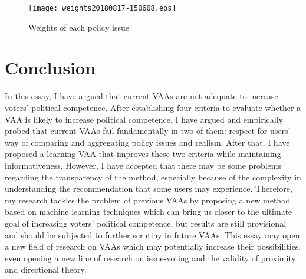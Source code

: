 \documentclass{scrartcl}
\begin{document}
\begin{figure}[h]
    \centering 
    \texttt{[image: weights20180817-150608.eps]}
    \label{fig:weights}
    \caption{Weights of each policy issue}
\end{figure}



\section{Conclusion}

In this essay, I have argued that current VAAs are not adequate to increase voters' political competence. After establishing four criteria to evaluate whether a VAA is likely to increase political competence, I have argued and empirically probed that current VAAs fail fundamentally in two of them: respect for users' way of comparing and aggregating policy issues and realism. After that, I have proposed a learning VAA that improves these two criteria while maintaining informativeness. However, I have accepted that there may be some problems regarding the transparency of the method, especially because of the complexity in understanding the recommendation that some users may experience. Therefore, my research tackles the problem of previous VAAs by proposing a new method based on machine learning techniques which can bring us closer to the ultimate goal of increasing voters' political competence, but results are still provisional and should be subjected to further scrutiny in future VAAs. This essay may open a new field of research on VAAs which may potentially increase their possibilities, even opening a new line of research on issue-voting and the validity of proximity and directional theory.

\pagebreak




\end{document}
